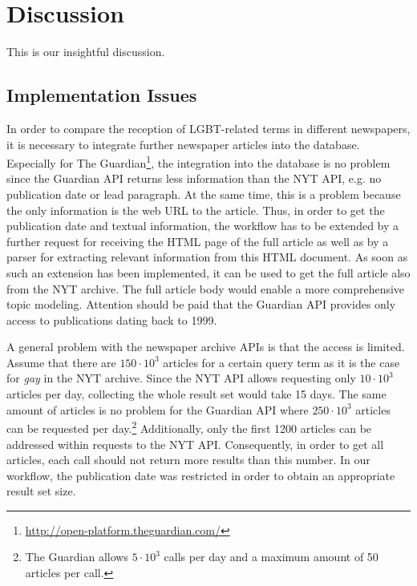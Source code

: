 \documentclass[10pt,a4paper,twocolumn]{scrartcl}
\begin{document}
\section{Discussion}
This is our insightful discussion.

\subsection{Implementation Issues}
In order to compare the reception of LGBT-related terms in different newspapers, it is necessary to integrate further newspaper articles into the database. Especially for The Guardian\footnote{\url{http://open-platform.theguardian.com/}}, the integration into the database is no problem since the Guardian API returns less information than the NYT API, e.g. no publication date or lead paragraph. At the same time, this is a problem because the only information is the web URL to the article. Thus, in order to get the publication date and textual information, the workflow has to be extended by a further request for receiving the HTML page of the full article as well as by a parser for extracting relevant information from this HTML document. As soon as such an extension has been implemented, it can be used to get the full article also from the NYT archive. The full article body would enable a more comprehensive topic modeling. Attention should be paid that the Guardian API provides only access to publications dating back to 1999.

A general problem with the newspaper archive APIs is that the access is limited. Assume that there are $150 \cdot 10^3$ articles for a certain query term as it is the case for \textit{gay} in the NYT archive. Since the NYT API allows requesting only $10\cdot 10^3$ articles per day, collecting the whole result set would take 15 days. The same amount of articles is no problem for the Guardian API where $250\cdot 10^3$ articles can be requested per day.\footnote{The Guardian allows $5\cdot 10^3$ calls per day and a maximum amount of 50 articles per call.} Additionally, only the first 1200 articles can be addressed within requests to the NYT API. Consequently, in order to get all articles, each call should not return more results than this number. In our workflow, the publication date was restricted in order to obtain an appropriate result set size.
\end{document}
